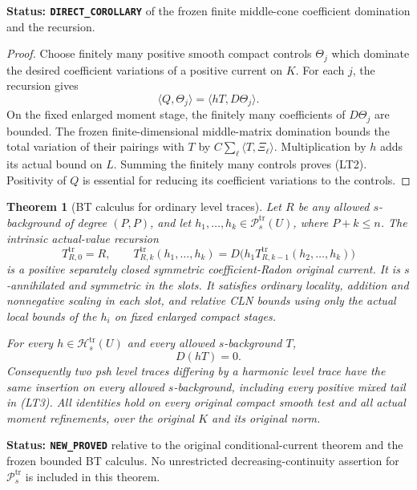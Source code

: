 \documentclass[11pt,a4paper]{article}
\numberwithin{equation}{section}
\newtheorem{theorem}{Theorem}[section]
\theoremstyle{definition}
\theoremstyle{remark}
\begin{document}
\noindent\textbf{Status: \texttt{DIRECT\_COROLLARY}} of the
frozen finite middle-cone coefficient domination and the recursion.

\begin{proof}
Choose finitely many positive smooth compact controls $\Theta_j$
which dominate the desired coefficient variations of a positive
current on $K$. For each $j$, the recursion gives
\[
                 \langle Q,\Theta_j\rangle
                         =\langle hT,D\Theta_j\rangle.
\]
On the fixed enlarged moment stage, the finitely many coefficients
of $D\Theta_j$ are bounded. The frozen finite-dimensional
middle-matrix domination bounds the total variation of their
pairings with $T$ by $C\sum_\ell\langle T,\Xi_\ell\rangle$.
Multiplication by $h$ adds its actual bound on $L$. Summing the
finitely many controls proves (LT2). Positivity of $Q$ is essential
for reducing its coefficient variations to the controls.
\end{proof}

\begin{theorem}[BT calculus for ordinary level traces]
\label{thm:r12-level-trace-BT}
Let $R$ be any allowed $s$-background of degree $(P,P)$, and let
$h_1,\ldots,h_k\in\mathcal P_s^{\mathrm{tr}}(U)$, where $P+k\le n$.
The intrinsic actual-value recursion
\[
       T^{\mathrm{tr}}_{R,0}=R,\qquad
       T^{\mathrm{tr}}_{R,k}(h_1,\ldots,h_k)
           =D\bigl(h_1T^{\mathrm{tr}}_{R,k-1}(h_2,\ldots,h_k)\bigr)
                                                                    \tag{LT3}
\]
is a positive separately closed symmetric coefficient-Radon
original current. It is $s$-annihilated and symmetric in the slots.
It satisfies ordinary locality, addition and nonnegative scaling
in each slot, and relative CLN bounds using only the actual local
bounds of the $h_i$ on fixed enlarged compact stages.

For every $h\in\mathcal H_s^{\mathrm{tr}}(U)$ and every allowed
$s$-background $T$,
\[
                                  D(hT)=0.                         \tag{LT4}
\]
Consequently two psh level traces differing by a harmonic level
trace have the same insertion on every allowed $s$-background,
including every positive mixed tail in (LT3). All identities hold
on every original compact smooth test and all actual moment
refinements, over the original $K$ and its original norm.
\end{theorem}

\noindent\textbf{Status: \texttt{NEW\_PROVED}} relative to the
original conditional-current theorem and the frozen bounded BT
calculus. No unrestricted decreasing-continuity assertion for
$\mathcal P_s^{\mathrm{tr}}$ is included in this theorem.
\end{document}
